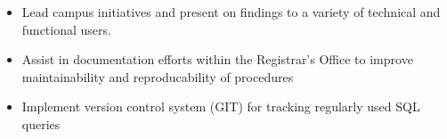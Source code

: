 \documentclass[]{two-column-stats} %
\begin{document}
\begin{entrylist}
{\begin{itemize}
\begin{itemize}
\begin{itemize}
    \end{itemize}
    \item Improve maintenance of student programs and majors in Banner \& DegreeWorks so that we have accurate reporting to governing bodies and students
    \item Migrate reports from Microsoft Access to bespoke Python \& \LaTeX pipelines, or Argos \& Tableau to improve maintainability and visual appeal
  \end{itemize}
  \item Lead campus initiatives and present on findings to a variety of technical and functional users.
  \item Assist in documentation efforts within the Registrar's Office to improve maintainability and reproducability of procedures
  \item Implement version control system (GIT) for tracking regularly used SQL queries
\end{itemize}
}
\end{entrylist}
\end{document}
